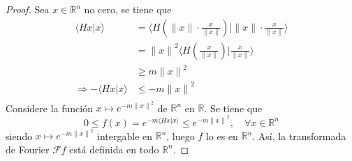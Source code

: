 \documentclass[12pt]{report}
\theoremstyle{largebreak}
\renewcommand{\leq}{\ensuremath{\leqslant}}
\renewcommand{\geq}{\ensuremath{\geqslant}}
\newcommand\norm[1]{\ensuremath{\|#1\|}}
\newcommand\pint[2]{\ensuremath{\langle#1| #2\rangle}}
\newcommand{\fou}[1]{\ensuremath{\mathcal{F}#1}}
\begin{document}
\begin{proof}
        Sea $x\in\mathbb{R}^n$ no cero, se tiene que
        \begin{equation*}
            \begin{split}
                \pint{Hx}{x}
                &=\pint{H\left(\norm{x}\cdot\frac{x}{\norm{x}}\right)}{\norm{x}\cdot\frac{x}{\norm{x}}}\\
                &=\norm{x}^2\pint{H\left(\frac{x}{\norm{x}}\right)}{\frac{x}{\norm{x}}}\\
                &\geq m\norm{x}^2\\
                \Rightarrow -\pint{Hx}{x}&\leq -m\norm{x}^2\\
            \end{split}
        \end{equation*}
        Considere la función $x\mapsto e^{ -m\norm{x}^2}$ de $\mathbb{R}^n$ en $\mathbb{R}$. Se tiene que
        \begin{equation*}
            0\leq f(x)=e^{ -m\pint{Hx}{x}}\leq e^{ -m\norm{x}^2},\quad\forall x\in\mathbb{R}^n
        \end{equation*}
        siendo $x\mapsto e^{ -m\norm{x}^2}$ intergable en $\mathbb{R}^n$, luego $f$ lo es en $\mathbb{R}^n$. Así, la transformada de Fourier $\fou{f}$ está definida en todo $\mathbb{R}^n$.


\end{proof}
\end{document}

